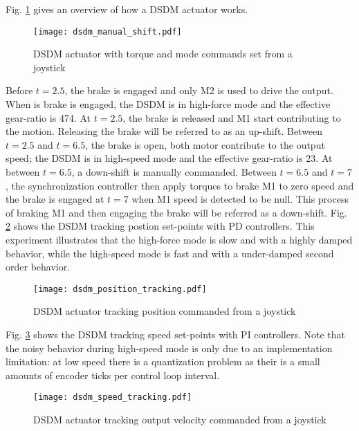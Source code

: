 %

Fig. \ref{fig:dsdm_manual_shift} gives an overview of how a DSDM actuator works. 
%
\begin{figure}[H]
	\centering
		\texttt{[image: dsdm\_manual\_shift.pdf]}
	\caption[DSDM behavior overview]{DSDM actuator with torque and mode commands set from a joystick}
	\label{fig:dsdm_manual_shift}
\end{figure}
%
Before $t=2.5$, the brake is engaged and only M2 is used to drive the output. When is brake is engaged, the DSDM is in high-force mode and the effective gear-ratio is 474. At $t=2.5$, the brake is released and M1 start contributing to the motion. Releasing the brake will be referred to as an up-shift. Between $t=2.5$ and $t=6.5$, the brake is open, both motor contribute to the output speed; the DSDM is in high-speed mode and the effective gear-ratio is 23. At between $t=6.5$, a down-shift is manually commanded. Between $t=6.5$ and $t=7$, the synchronization controller then apply torques to brake M1 to zero speed and the brake is engaged at $t=7$ when M1 speed is detected to be null. This process of braking M1 and then engaging the brake will be referred as a down-shift.
%
Fig. \ref{fig:dsdm_position_tracking} shows the DSDM tracking postion set-points with PD controllers. This experiment illustrates that the high-force mode is slow and with a highly damped behavior, while the high-speed mode is fast and with a under-damped second order behavior. 
%
\begin{figure}[H]
	\centering
		\texttt{[image: dsdm\_position\_tracking.pdf]}
	\caption[DSDM actuator position control]{DSDM actuator tracking position commanded from a joystick }
	\label{fig:dsdm_position_tracking}
\end{figure}
%
Fig. \ref{fig:dsdm_speed_tracking} shows the DSDM tracking speed set-points with PI controllers. Note that the noisy behavior during high-speed mode is only due to an implementation limitation: at low speed there is a quantization problem as their is a small amounts of encoder ticks per control loop interval. 
%
\begin{figure}[H]
	\centering
		\texttt{[image: dsdm\_speed\_tracking.pdf]}
	\caption[DSDM actuator velocity control]{DSDM actuator tracking output velocity commanded from a joystick }
	\label{fig:dsdm_speed_tracking}
\end{figure}


